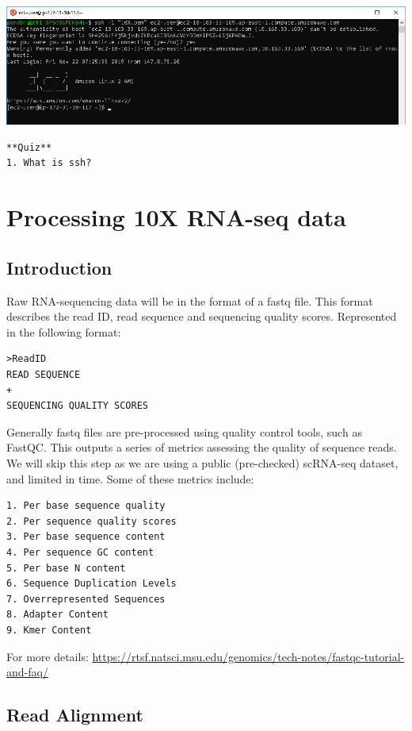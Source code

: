 \documentclass[]{book}
\begin{document}
\includegraphics[width=9.79in]{_book/10X_files/figure-html/ssh}

\begin{verbatim}
**Quiz**
1. What is ssh?
\end{verbatim}

\hypertarget{processing-10x-rna-seq-data}{%
\chapter{Processing 10X RNA-seq data}\label{processing-10x-rna-seq-data}}

\hypertarget{introduction-1}{%
\section{Introduction}\label{introduction-1}}

Raw RNA-sequencing data will be in the format of a fastq file. This format describes the read ID, read sequence and sequencing quality scores. Represented in the following format:

\begin{verbatim}
>ReadID
READ SEQUENCE
+
SEQUENCING QUALITY SCORES
\end{verbatim}

Generally fastq files are pre-processed using quality control tools, such as FastQC. This outputs a series of metrics assessing the quality of sequence reads. We will skip this step as we are using a public (pre-checked) scRNA-seq dataset, and limited in time. Some of these metrics include:

\begin{verbatim}
1. Per base sequence quality
2. Per sequence quality scores
3. Per base sequence content
4. Per sequence GC content
5. Per base N content
6. Sequence Duplication Levels
7. Overrepresented Sequences
8. Adapter Content
9. Kmer Content
\end{verbatim}

For more details: \url{https://rtsf.natsci.msu.edu/genomics/tech-notes/fastqc-tutorial-and-faq/}

\hypertarget{read-alignment}{%
\section{Read Alignment}\label{read-alignment}}
\end{document}
